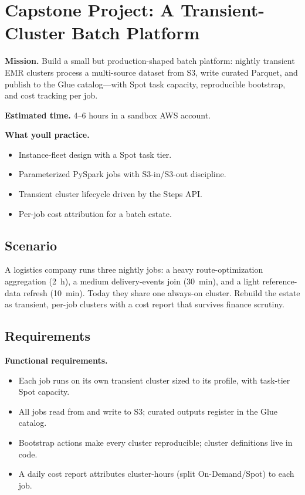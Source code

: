 \section{Capstone Project: A Transient-Cluster Batch Platform}\label{sec:ch9-capstone}

\begin{capstonebox}
\textbf{Mission.} Build a small but production-shaped batch platform: nightly transient EMR clusters process a multi-source dataset from S3, write curated Parquet, and publish to the Glue catalog---with Spot task capacity, reproducible bootstrap, and cost tracking per job.

\textbf{Estimated time.} 4--6 hours in a sandbox AWS account.

\textbf{What you\textquotesingle{}ll practice.}
\begin{itemize}
    \item Instance-fleet design with a Spot task tier.
    \item Parameterized PySpark jobs with S3-in/S3-out discipline.
    \item Transient cluster lifecycle driven by the Steps API.
    \item Per-job cost attribution for a batch estate.
\end{itemize}
\end{capstonebox}

\subsection*{Scenario}
A logistics company runs three nightly jobs: a heavy route-optimization aggregation (2~h), a medium delivery-events join (30~min), and a light reference-data refresh (10~min). Today they share one always-on cluster. Rebuild the estate as transient, per-job clusters with a cost report that survives finance scrutiny.

\subsection*{Requirements}
\textbf{Functional requirements.}
\begin{itemize}
    \item Each job runs on its own transient cluster sized to its profile, with task-tier Spot capacity.
    \item All jobs read from and write to S3; curated outputs register in the Glue catalog.
    \item Bootstrap actions make every cluster reproducible; cluster definitions live in code.
    \item A daily cost report attributes cluster-hours (split On-Demand/Spot) to each job.
\end{itemize}

